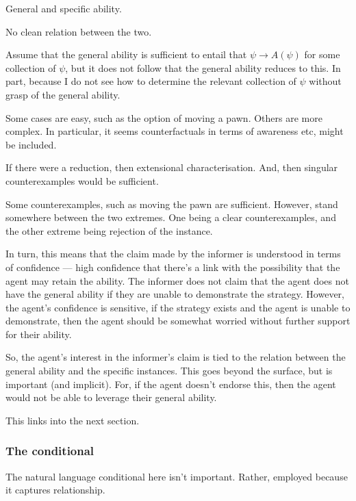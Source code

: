 \documentclass[10pt]{article}
\begin{document}
\begin{note}[Abilities]
  General and specific ability.

  No clean relation between the two.

  Assume that the general ability is sufficient to entail that \(\psi \rightarrow A(\psi)\) for some collection of \(\psi\), but it does not follow that the general ability reduces to this.
  In part, because I do not see how to determine the relevant collection of \(\psi\) without grasp of the general ability.

  Some cases are easy, such as the option of moving a pawn.
  Others are more complex.
  In particular, it seems counterfactuals in terms of awareness etc, might be included.

  If there were a reduction, then extensional characterisation.
  And, then singular counterexamples would be sufficient.

  Some counterexamples, such as moving the pawn are sufficient.
  However, stand somewhere between the two extremes.
  One being a clear counterexamples, and the other extreme being rejection of the instance.

  In turn, this means that the claim made by the informer is understood in terms of confidence --- high confidence that there's a link with the possibility that the agent may retain the ability.
  The informer does not claim that the agent does not have the general ability if they are unable to demonstrate the strategy.
  However, the agent's confidence is sensitive, if the strategy exists and the agent is unable to demonstrate, then the agent should be somewhat worried without further support for their ability.

  So, the agent's interest in the informer's claim is tied to the relation between the general ability and the specific instances.
  This goes beyond the surface, but is important (and implicit).
  For, if the agent doesn't endorse this, then the agent would not be able to leverage their general ability.

  {
    \color{red}
    This links into the next section.
  }
\end{note}


\subsubsection{The conditional}
\label{sec:conditional}

The natural language conditional here isn't important.
Rather, employed because it captures relationship.
\end{document}
